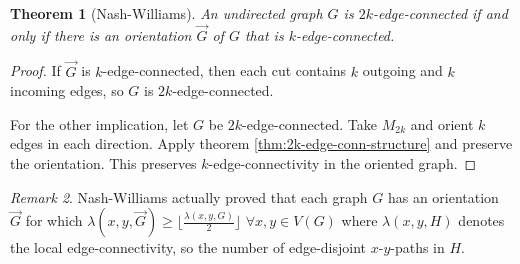 \documentclass[11pt, a4paper]{article}
\newcommand{\floor}[1]{\lfloor #1 \rfloor}
\newtheorem{theorem}{Theorem}[section]
\theoremstyle{remark}
\newtheorem{remark}[theorem]{Remark}
\theoremstyle{definition}
\begin{document}
\begin{theorem}[Nash-Williams]
	An undirected graph $G$ is $2k$-edge-connected if and only if there is
	an orientation $\vec{G}$ of $G$ that is $k$-edge-connected.
\end{theorem}
\begin{proof}
	If $\vec{G}$ is $k$-edge-connected, then each cut contains $k$ outgoing
	and $k$ incoming edges, so $G$ is $2k$-edge-connected.

	For the other implication, let $G$ be $2k$-edge-connected. Take $M_{2k}$
	and orient $k$ edges in each direction. Apply theorem
	\ref{thm:2k-edge-conn-structure} and preserve the orientation. This
	preserves $k$-edge-connectivity in the oriented graph.
\end{proof}

\begin{remark}
	Nash-Williams actually proved that each graph $G$ has an
	orientation $\vec{G}$ for which $\lambda(x,y,\vec{G})\geq
	\floor{\frac{\lambda(x,y,G)}{2}}$ $\forall x,y\in V(G)$ where
	$\lambda(x,y,H)$ denotes the local edge-connectivity, so the
	number of edge-disjoint $x$-$y$-paths in $H$.
\end{remark}
\end{document}
